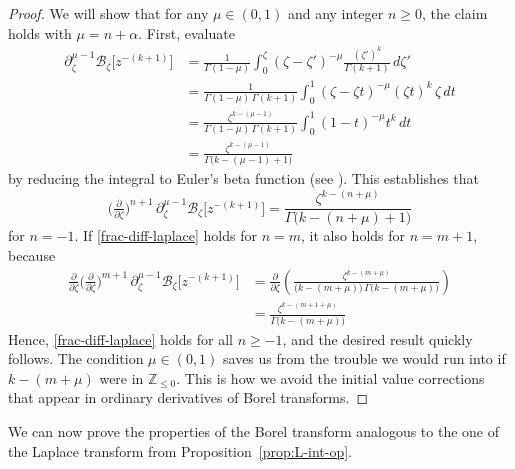 \documentclass{article}
\newcommand{\Z}{\mathbb{Z}}
\newcommand{\borel}{\mathcal{B}}
\theoremstyle{definition}
\theoremstyle{plain}
\begin{document}
\begin{proof}
We will show that for any $\mu \in (0, 1)$ and any integer $n \ge 0$, the claim holds with $\mu = n + \alpha$. First, evaluate
\begin{align*}
\partial^{\mu-1}_{\zeta} \borel_\zeta \big[z^{-(k+1)}\big] & = \frac{1}{\Gamma(1-\mu)} \int_0^\zeta (\zeta-\zeta')^{-\mu} \frac{(\zeta')^k}{\Gamma(k+1)}\,d\zeta' \\
& = \frac{1}{\Gamma(1-\mu)\,\Gamma(k+1)} \int_0^1 (\zeta-\zeta t)^{-\mu} (\zeta t)^k\,\zeta\,dt \\
& = \frac{\zeta^{k-(\mu-1)}}{\Gamma(1-\mu)\,\Gamma(k+1)} \int_0^1 (1-t)^{-\mu} t^k\,dt \\
& = \frac{\zeta^{k-(\mu-1)}}{\Gamma\big(k-(\mu-1)+1\big)}
\end{align*}
by reducing the integral to Euler's beta function (see \cite[Identity 5.12.1]{dlmf}). This establishes that
\begin{equation}\label{frac-diff-laplace}
\big(\tfrac{\partial}{\partial \zeta}\big)^{n+1}\,\partial^{\mu-1}_{\zeta } \borel_\zeta \big[z^{-(k+1)}\big] = \frac{\zeta^{k-(n+\mu)}}{\Gamma\big(k-(n+\mu)+1\big)}
\end{equation}
for $n = -1$. If \eqref{frac-diff-laplace} holds for $n = m$, it also holds for $n = m+1$, because
\begin{align*}
\tfrac{\partial}{\partial \zeta} \big(\tfrac{\partial}{\partial \zeta}\big)^{m+1}\,\partial^{\mu-1}_{\zeta} \borel_\zeta \big[z^{-(k+1)}\big] & = \frac{\partial}{\partial \zeta} \left( \frac{\zeta^{k-(m+\mu)}}{\big(k-(m+\mu)\big)\,\Gamma\big(k-(m+\mu)\big)} \right) \\
& = \frac{\zeta^{k-(m+1+\mu)}}{\Gamma\big(k-(m+\mu)\big)}
\end{align*}
Hence, \eqref{frac-diff-laplace} holds for all $n \ge -1$, and the desired result quickly follows. The condition $\mu \in (0, 1)$ saves us from the trouble we would run into if $k-(m+\mu)$ were in $\Z_{\le 0}$. This is how we avoid the initial value corrections that appear in ordinary derivatives of Borel transforms.
\end{proof}
We can now prove the properties of the Borel transform analogous to the one of the Laplace transform from Proposition~\ref{prop:L-int-op}.
\end{document}
